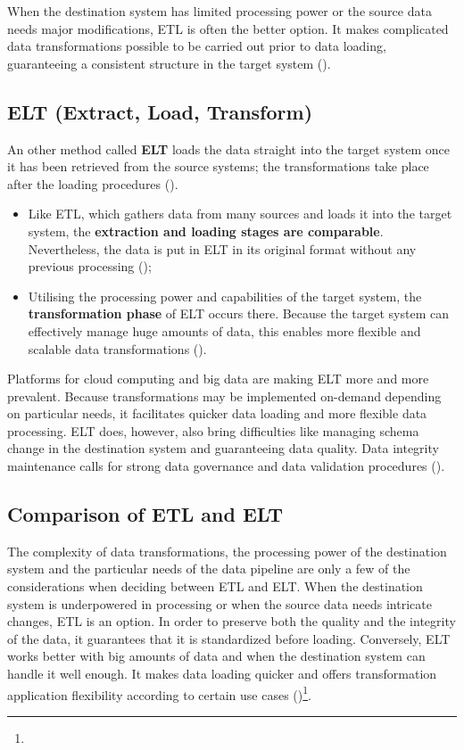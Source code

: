 When the destination system has limited processing power or the source data needs major modifications, ETL is often the better option. It makes complicated data transformations possible to be carried out prior to data loading, guaranteeing a consistent structure in the target system (\cite{etleltDatacamp})\footnotemark[22].

\subsection{ELT (Extract, Load, Transform)}
An other method called \textbf{ELT} loads the data straight into the target system once it has been retrieved from the source systems; the transformations take place after the loading procedures (\cite{etleltDatacamp})\footnotemark[22].

\begin{itemize}
    \item Like ETL, which gathers data from many sources and loads it into the target system, the \textbf{extraction and loading stages are comparable}. Nevertheless, the data is put in ELT in its original format without any previous processing (\cite{etleltDatacamp})\footnotemark[22];
    \item Utilising the processing power and capabilities of the target system, the \textbf{transformation phase} of ELT occurs there. Because the target system can effectively manage huge amounts of data, this enables more flexible and scalable data transformations (\cite{etleltDatacamp})\footnotemark[22].
\end{itemize}

Platforms for cloud computing and big data are making ELT more and more prevalent. Because transformations may be implemented on-demand depending on particular needs, it facilitates quicker data loading and more flexible data processing. ELT does, however, also bring difficulties like managing schema change in the destination system and guaranteeing data quality. Data integrity maintenance calls for strong data governance and data validation procedures (\cite{etleltDatacamp})\footnotemark[22].

\subsection{Comparison of ETL and ELT}
The complexity of data transformations, the processing power of the destination system and the particular needs of the data pipeline are only a few of the considerations when deciding between ETL and ELT. When the destination system is underpowered in processing or when the source data needs intricate changes, ETL is an option. In order to preserve both the quality and the integrity of the data, it guarantees that it is standardized before loading. Conversely, ELT works better with big amounts of data and when the destination system can handle it well enough. It makes data loading quicker and offers transformation application flexibility according to certain use cases (\cite{etleltDatacamp})\footnote[22]{}.

